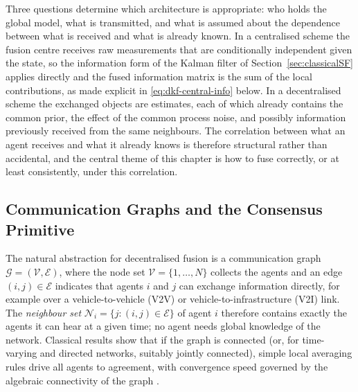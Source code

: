 Three questions determine which architecture is appropriate: who holds the global model, what is transmitted, and what is assumed about the dependence between what is received and what is already known. In a centralised scheme the fusion centre receives raw measurements that are conditionally independent given the state, so the information form of the Kalman filter of Section~\ref{sec:classicalSF} applies directly and the fused information matrix is the sum of the local contributions, as made explicit in \eqref{eq:dkf-central-info} below. In a decentralised scheme the exchanged objects are estimates, each of which already contains the common prior, the effect of the common process noise, and possibly information previously received from the same neighbours. The correlation between what an agent receives and what it already knows is therefore structural rather than accidental, and the central theme of this chapter is how to fuse correctly, or at least consistently, under this correlation.

\subsection{Communication Graphs and the Consensus Primitive}
\label{subsec:mas-graph-primitive}

%
The natural abstraction for decentralised fusion is a communication graph $\mathcal{G}=(\mathcal{V},\mathcal{E})$, where the node set $\mathcal{V}=\{1,\dots,N\}$ collects the agents and an edge $(i,j)\in\mathcal{E}$ indicates that agents $i$ and $j$ can exchange information directly, for example over a vehicle-to-vehicle (V2V) or vehicle-to-infrastructure (V2I) link. The \emph{neighbour set} $\mathcal{N}_i=\{j:(i,j)\in\mathcal{E}\}$ of agent $i$ therefore contains exactly the agents it can hear at a given time; no agent needs global knowledge of the network. Classical results show that if the graph is connected (or, for time-varying and directed networks, suitably jointly connected), simple local averaging rules drive all agents to agreement, with convergence speed governed by the algebraic connectivity of the graph \cite{olfatisaber2007_consensus,ren2005_consensus}.

